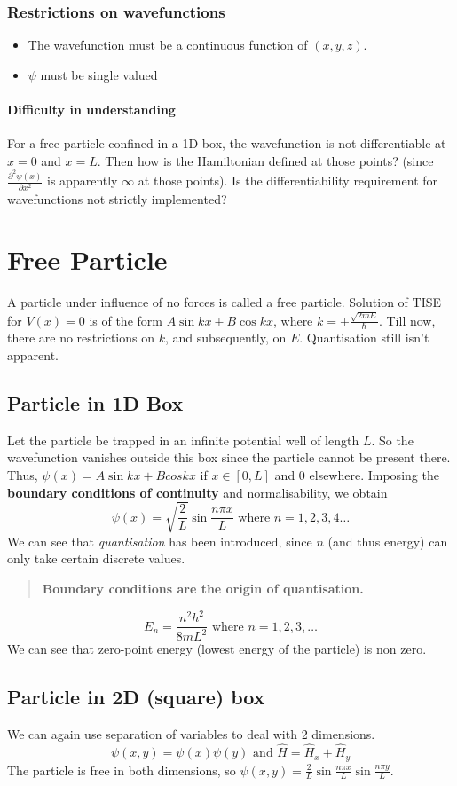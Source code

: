 \documentclass[12pt]{article}
\begin{document}
\subsubsection*{Restrictions on wavefunctions}
\begin{itemize}
\item The wavefunction must be a continuous function of $(x, y, z)$.
\item $\psi$ must be single valued
\end{itemize}
\paragraph{Difficulty in understanding} For a free particle confined in a 1D box, the wavefunction is not differentiable at $x=0$ and $x=L$. Then how is the Hamiltonian defined at those points? (since $\displaystyle \frac{\partial^2 \psi(x)}{\partial x^2}$ is apparently $\infty$ at those points). Is the differentiability requirement for wavefunctions not strictly implemented?

\section{Free Particle}
A particle under influence of no forces is called a free particle. Solution of TISE for $V(x)=0$ is of the form $A \sin{kx} + B \cos{kx}$, where $k=\pm \frac{\sqrt{2mE}}{\hbar}$.
Till now, there are no restrictions on $k$, and subsequently, on $E$. Quantisation still isn't apparent.
\subsection*{Particle in 1D Box}
Let the particle be trapped in an infinite potential well of length $L$. So the wavefunction vanishes outside this box since the particle cannot be present there. Thus, $\psi(x)=A \sin{kx} + B cos{kx}$ if $x\in [0, L]$ and $0 $ elsewhere.
Imposing the \textbf{boundary conditions of continuity} and normalisability, we obtain 
\[\psi(x)=\sqrt{\frac{2}{L}} \sin{\frac{n \pi x}{L}} \textrm{ where } n=1, 2, 3, 4 \dots \]
We can see that \emph{quantisation} has been introduced, since $n$ (and thus energy) can only take certain discrete values.
\begin{quote}
\textbf{Boundary conditions are the origin of quantisation.}
\end{quote}
\[E_n = \frac{n^2 h^2}{8m L^2} \textrm{ where } n=1, 2, 3, \ldots\]
We can see that zero-point energy (lowest energy of the particle) is non zero.
\subsection*{Particle in 2D (square) box}
We can again use separation of variables to deal with 2 dimensions.
\[\psi(x,y)=\psi(x)\psi(y)\textrm{ and } \hat{H}=\hat{H}_x+\hat{H}_y \]
The particle is free in both dimensions, so 
$\psi(x,y)=\frac{2}{L} \sin{\frac{n \pi x}{L}} \sin{\frac{n \pi y}{L}}$.
\end{document}
